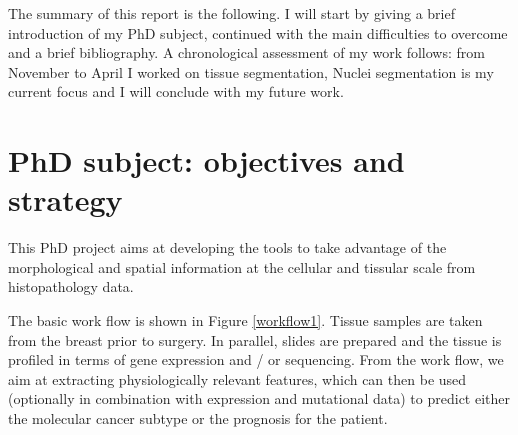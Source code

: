 \documentclass[a4paper,10pt,twocolumn]{article}
\begin{document}

\maketitle



The summary of this report is the following. I will start by giving a brief introduction of my PhD subject, continued with the main difficulties to overcome and a brief bibliography. A chronological assessment of my work follows: from November to April I worked on tissue segmentation, Nuclei segmentation is my current focus and I will conclude with my future work.

\section{PhD subject: objectives and strategy}

This  PhD  project aims at developing the tools to take advantage of
the morphological and spatial information at the cellular and tissular
scale from histopathology data. 


The basic work flow is shown in Figure \ref{workflow1}. Tissue samples
are taken from the breast prior to surgery. In parallel, slides are
prepared and the tissue is profiled in terms of gene expression and /
or sequencing. From the work flow, we aim at extracting physiologically
relevant features, which can then be used (optionally in combination with
expression and mutational data) to predict either the molecular
cancer subtype or the prognosis for the patient. 
\end{document}
